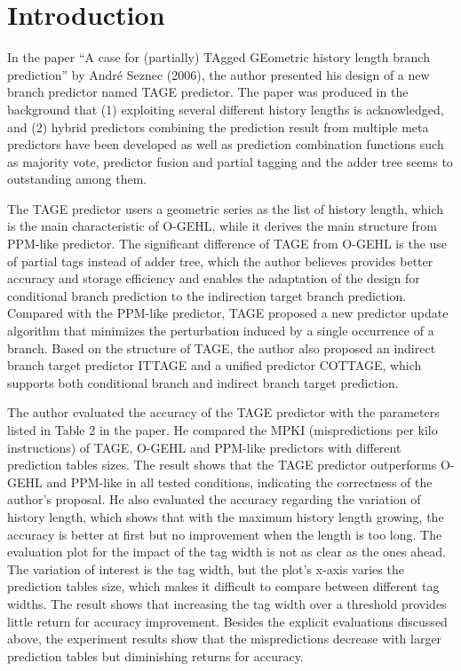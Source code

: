 \documentclass[screen,nonacm]{acmart}
\begin{document}
\maketitle

\section{Introduction}

In the paper ``A case for (partially) TAgged GEometric history length branch
prediction'' \cite{Seznec06jilp} by Andr{\'e} Seznec (2006),
the author presented his design of a new branch predictor named TAGE predictor.
The paper was produced in the background that
(1) exploiting several different history lengths is acknowledged, and
(2) hybrid predictors combining the prediction result from multiple meta predictors have been developed as well as prediction combination functions such as majority vote, predictor fusion and partial tagging and the adder tree seems to outstanding among them.

The TAGE predictor users a geometric series as the list of history length,
which is the main characteristic of O-GEHL\cite{Seznec05isca},
while it derives the main structure from PPM-like predictor\cite{Michaud05jilp}.
%
The significant difference of TAGE from O-GEHL is the use of partial tags instead of adder tree, which the author believes provides better accuracy and storage efficiency and enables the adaptation of the design for conditional branch prediction to the indirection target branch prediction.
Compared with the PPM-like predictor, TAGE proposed a new predictor update algorithm that minimizes the perturbation induced by a single occurrence of a branch.
%
Based on the structure of TAGE, the author also proposed an indirect branch target predictor ITTAGE and a unified predictor COTTAGE, which supports both conditional branch and indirect branch target prediction.

The author evaluated the accuracy of the TAGE predictor with the parameters listed in Table 2 in the paper.
He compared the MPKI (mispredictions per kilo instructions) of TAGE, O-GEHL\cite{Seznec05isca} and PPM-like\cite{Michaud05jilp} predictors with different prediction tables sizes.
The result shows that the TAGE predictor outperforms O-GEHL and PPM-like in all tested conditions, indicating the correctness of the author's proposal.
He also evaluated the accuracy regarding the variation of history length, which shows that with the maximum history length growing, the accuracy is better at first but no improvement when the length is too long.
The evaluation plot for the impact of the tag width is not as clear as the ones ahead.
The variation of interest is the tag width, but the plot's x-axis varies the prediction tables size, which makes it difficult to compare between different tag widths.
The result shows that increasing the tag width over a threshold provides little return for accuracy improvement.
Besides the explicit evaluations discussed above, the experiment results show that the mispredictions decrease with larger prediction tables but diminishing returns for accuracy.
\end{document}

